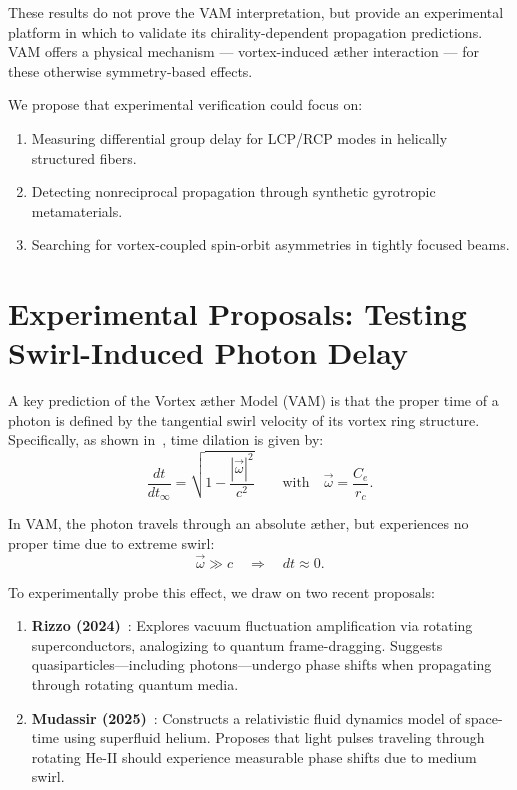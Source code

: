         These results do not prove the VAM interpretation, but provide an experimental platform in which to validate its chirality-dependent propagation predictions. VAM offers a physical mechanism — vortex-induced æther interaction — for these otherwise symmetry-based effects.

        We propose that experimental verification could focus on:
        \begin{enumerate}
            \item Measuring differential group delay for LCP/RCP modes in helically structured fibers.
            \item Detecting nonreciprocal propagation through synthetic gyrotropic metamaterials.
            \item Searching for vortex-coupled spin-orbit asymmetries in tightly focused beams.
        \end{enumerate}


\section{Experimental Proposals: Testing Swirl-Induced Photon Delay}\label{sec:swirl-delay-exp}

        A key prediction of the Vortex \ae ther Model (VAM) is that the proper time of a photon is defined by the tangential swirl velocity of its vortex ring structure. Specifically, as shown in~\cite{iskandarani2025b}, time dilation is given by:
        \begin{equation}
            \frac{dt}{dt_\infty} = \sqrt{1 - \frac{|\vec{\omega}|^2}{c^2}} \qquad \text{with} \quad \vec{\omega} = \frac{C_e}{r_c}.
        \end{equation}

        In VAM, the photon travels through an absolute æther, but experiences no proper time due to extreme swirl:
        \[
            \vec{\omega} \gg c \quad \Rightarrow \quad dt \approx 0.
        \]

        To experimentally probe this effect, we draw on two recent proposals:

        \begin{enumerate}
            \item \textbf{Rizzo (2024)}~\cite{rizzo2024rotating}: Explores vacuum fluctuation amplification via rotating superconductors, analogizing to quantum frame-dragging. Suggests quasiparticles—including photons—undergo phase shifts when propagating through rotating quantum media.

            \item \textbf{Mudassir (2025)}~\cite{mudassir2025fluid}: Constructs a relativistic fluid dynamics model of space-time using superfluid helium. Proposes that light pulses traveling through rotating He-II should experience measurable phase shifts due to medium swirl.
        \end{enumerate}


